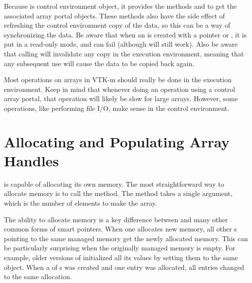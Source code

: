 Because  is control environment object, it provides
the methods   and
  to get the
associated array portal objects. These methods also have the side effect of
refreshing the control environment copy of the data, so this can be a way
of synchronizing the data. Be aware that when an
 is created with a pointer or
, it is put in a read-only mode, and
 can fail (although
 will still work). Also be aware that
calling  will invalidate any copy in the
execution environment, meaning that any subsequent use will cause the data
to be copied back again.


\begin{didyouknow}
  Most operations on arrays in VTK-m should really be done in the execution
  environment. Keep in mind that whenever doing an operation using a
  control array portal, that operation will likely be slow for large
  arrays. However, some operations, like performing file I/O, make sense in
  the control environment.
\end{didyouknow}



\section{Allocating and Populating Array Handles}
\label{sec:ArrayHandle:Allocate}
\label{sec:ArrayHandle:Populate}


 is capable of allocating its own memory. The most
straightforward way to allocate memory is to call the 
method. The  method takes a single argument, which is
the number of elements to make the array.


\begin{commonerrors}
  The ability to allocate memory is a key difference between
   and many other common forms of smart
  pointers. When one  allocates new memory, all
  other s pointing to the same managed memory
  get the newly allocated memory. This can be particularly surprising when
  the originally managed memory is empty. For example, older versions of
   initialized all its values by setting them to the
  same object. When a  of s
  was created and one entry was allocated, all entries changed to the same
  allocation.
\end{commonerrors}


